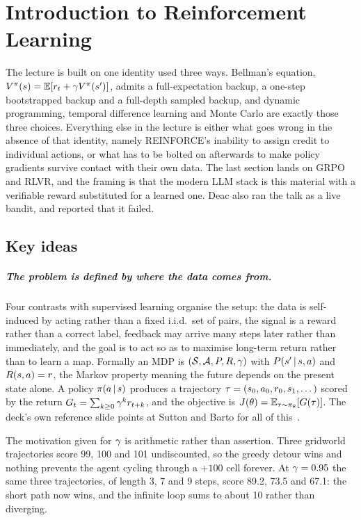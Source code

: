 \chapter{Introduction to Reinforcement Learning}
\label{ch:04-intro-reinforcement-learning}


The lecture is built on one identity used three ways. Bellman's equation,
$V^{\pi}(s) = \operatorname*{\mathbb{E}}[r_t + \gamma V^{\pi}(s')]$, admits a full-expectation backup, a
one-step bootstrapped backup and a full-depth sampled backup, and dynamic programming,
temporal difference learning and Monte Carlo are exactly those three choices. Everything
else in the lecture is either what goes wrong in the absence of that identity, namely
REINFORCE's inability to assign credit to individual actions, or what has to be bolted on
afterwards to make policy gradients survive contact with their own data. The last section
lands on GRPO and RLVR, and the framing is that the modern LLM stack is this material with a
verifiable reward substituted for a learned one. Deac also ran the talk as a live bandit,
and reported that it failed.

\section*{Key ideas}

\paragraph{The problem is defined by where the data comes from.} Four contrasts with
supervised learning organise the setup: the data is self-induced by acting rather than a
fixed i.i.d.\ set of pairs, the signal is a reward rather than a correct label, feedback may
arrive many steps later rather than immediately, and the goal is to act so as to maximise
long-term return rather than to learn a map. Formally an MDP is
$(\mathcal{S}, \mathcal{A}, P, R, \gamma)$ with $P(s' \,|\, s, a)$ and
$R(s,a) = r$, the Markov property meaning the future depends on the present state alone.
A policy $\pi(a \,|\, s)$ produces a trajectory
$\tau = (s_0, a_0, r_0, s_1, \dots)$ scored by the return
$G_t = \sum_{k \ge 0} \gamma^{k} r_{t+k}$, and the objective is
$J(\theta) = \operatorname*{\mathbb{E}}_{\tau \sim \pi_{\theta}}[G(\tau)]$. The deck's own reference slide points
at Sutton and Barto for all of this~\citep{sutton2018}.

The motivation given for $\gamma$ is arithmetic rather than assertion. Three gridworld trajectories score 99, 100 and 101
undiscounted, so the greedy detour wins and nothing prevents the agent cycling through a
$+100$ cell forever. At $\gamma = 0.95$ the same three trajectories, of length 3, 7 and 9
steps, score 89.2, 73.5 and 67.1: the short path now wins, and the infinite loop sums to
about 10 rather than diverging.

